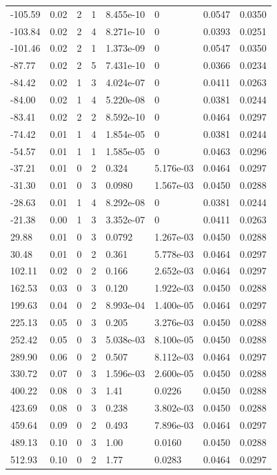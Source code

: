 \documentclass[preview]{standalone}
\begin{document}
{{\begin{tabular}{L{1.2cm}C{1.2cm} C{0.3cm}C{0.5cm} C{1.4cm}C{1.4cm} C{1.4cm}C{1.4cm}}
  -105.59  &  0.02  & 2     &  1 &  8.455e-10  & 0  & 0.0547 &  0.0350   \\ 
  -103.84  &  0.02  & 2     &  4 &  8.271e-10  & 0  & 0.0393 &  0.0251   \\ 
  -101.46  &  0.02  & 2     &  1 &  1.373e-09  & 0  & 0.0547 &  0.0350   \\ 
  -87.77  &  0.02  & 2     &  5 &  7.431e-10  & 0  & 0.0366 &  0.0234   \\ 
  -84.42  &  0.02  & 1     &  3 &  4.024e-07  & 0  & 0.0411 &  0.0263   \\ 
  -84.00  &  0.02  & 1     &  4 &  5.220e-08  & 0  & 0.0381 &  0.0244   \\ 
  -83.41  &  0.02  & 2     &  2 &  8.592e-10  & 0  & 0.0464 &  0.0297   \\ 
  -74.42  &  0.01  & 1     &  4 &  1.854e-05  & 0  & 0.0381 &  0.0244   \\ 
  -54.57  &  0.01  & 1     &  1 &  1.585e-05  & 0  & 0.0463 &  0.0296   \\ 
  -37.21  &  0.01  & 0     &  2 &  0.324  & 5.176e-03  & 0.0464 &  0.0297   \\ 
  -31.30  &  0.01  & 0     &  3 &  0.0980  & 1.567e-03  & 0.0450 &  0.0288   \\ 
  -28.63  &  0.01  & 1     &  4 &  8.292e-08  & 0  & 0.0381 &  0.0244   \\ 
  -21.38  &  0.00  & 1     &  3 &  3.352e-07  & 0  & 0.0411 &  0.0263   \\ 
  29.88  &  0.01  & 0     &  3 &  0.0792  & 1.267e-03  & 0.0450 &  0.0288   \\ 
  30.48  &  0.01  & 0     &  2 &  0.361  & 5.778e-03  & 0.0464 &  0.0297   \\ 
  102.11  &  0.02  & 0     &  2 &  0.166  & 2.652e-03  & 0.0464 &  0.0297   \\ 
  162.53  &  0.03  & 0     &  3 &  0.120  & 1.922e-03  & 0.0450 &  0.0288   \\ 
  199.63  &  0.04  & 0     &  2 &  8.993e-04  & 1.400e-05  & 0.0464 &  0.0297   \\ 
  225.13  &  0.05  & 0     &  3 &  0.205  & 3.276e-03  & 0.0450 &  0.0288   \\ 
  252.42  &  0.05  & 0     &  3 &  5.038e-03  & 8.100e-05  & 0.0450 &  0.0288   \\ 
  289.90  &  0.06  & 0     &  2 &  0.507  & 8.112e-03  & 0.0464 &  0.0297   \\ 
  330.72  &  0.07  & 0     &  3 &  1.596e-03  & 2.600e-05  & 0.0450 &  0.0288   \\ 
  400.22  &  0.08  & 0     &  3 &  1.41  & 0.0226  & 0.0450 &  0.0288   \\ 
  423.69  &  0.08  & 0     &  3 &  0.238  & 3.802e-03  & 0.0450 &  0.0288   \\ 
  459.64  &  0.09  & 0     &  2 &  0.493  & 7.896e-03  & 0.0464 &  0.0297   \\ 
  489.13  &  0.10  & 0     &  3 &  1.00  & 0.0160  & 0.0450 &  0.0288   \\ 
  512.93  &  0.10  & 0     &  2 &  1.77  & 0.0283  & 0.0464 &  0.0297   \\ 
\hline 
\end{tabular} 

}}
\end{document}
